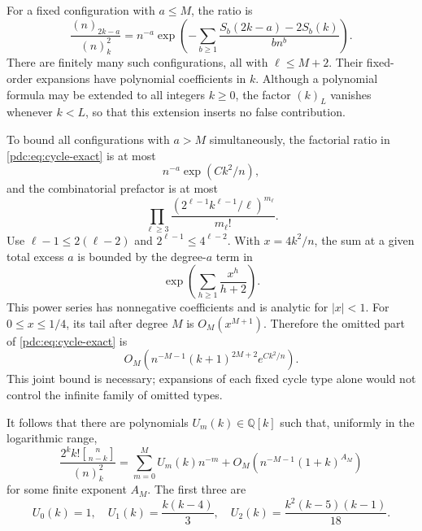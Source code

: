 \documentclass[11pt,letterpaper]{article}
\theoremstyle{remark}\newtheorem{remark}[theorem]{Remark}
\newcommand{\fall}[2]{(#1)_{#2}}
\newcommand{\stirone}[2]{\genfrac{[}{]}{0pt}{}{#1}{#2}}
\newcommand{\Q}{\mathbb Q}
\begin{document}
For a fixed configuration with $a\leq M$, the ratio is
\begin{equation}\label{pdc:eq:outer-ratio}
 \frac{\fall{n}{2k-a}}{\fall{n}{k}^2}
 =n^{-a}\exp\left(-\sum_{b\geq1}
              \frac{S_b(2k-a)-2S_b(k)}{b n^b}\right).
\end{equation}
There are finitely many such configurations, all with $\ell\leq M+2$. Their fixed-order expansions have polynomial coefficients in $k$. Although a polynomial formula may be extended to all integers $k\geq0$, the factor $\fall{k}{L}$ vanishes whenever $k<L$, so that this extension inserts no false contribution.

To bound all configurations with $a>M$ simultaneously, the factorial ratio in \eqref{pdc:eq:cycle-exact} is at most
\[
 n^{-a}\exp(Ck^2/n),
\]
and the combinatorial prefactor is at most
\[
 \prod_{\ell\geq3}\frac{(2^{\ell-1}k^{\ell-1}/\ell)^{m_\ell}}{m_\ell!}.
\]
Use $\ell-1\leq2(\ell-2)$ and $2^{\ell-1}\leq4^{\ell-2}$. With $x=4k^2/n$, the sum at a given total excess $a$ is bounded by the degree-$a$ term in
\begin{equation}\label{pdc:eq:long-cycle-majorant}
 \exp\left(\sum_{h\geq1}\frac{x^h}{h+2}\right).
\end{equation}
This power series has nonnegative coefficients and is analytic for $|x|<1$. For $0\leq x\leq1/4$, its tail after degree $M$ is $O_M(x^{M+1})$. Therefore the omitted part of \eqref{pdc:eq:cycle-exact} is
\begin{equation}\label{pdc:eq:cycle-tail}
 O_M\!\left(n^{-M-1}(k+1)^{2M+2}e^{Ck^2/n}\right).
\end{equation}
This joint bound is necessary; expansions of each fixed cycle type alone would not control the infinite family of omitted types.

It follows that there are polynomials $U_m(k)\in\Q[k]$ such that, uniformly in the logarithmic range,
\begin{equation}\label{pdc:eq:Uexp}
 \frac{2^k k!\stirone{n}{n-k}}{\fall{n}{k}^2}
 =\sum_{m=0}^M U_m(k)n^{-m}
     +O_M\!\left(n^{-M-1}(1+k)^{A_M}\right)
\end{equation}
for some finite exponent $A_M$. The first three are
\begin{equation}\label{pdc:eq:U012}
 U_0(k)=1,\quad U_1(k)=\frac{k(k-4)}3,\quad
 U_2(k)=\frac{k^2(k-5)(k-1)}{18}.
\end{equation}
\end{document}

